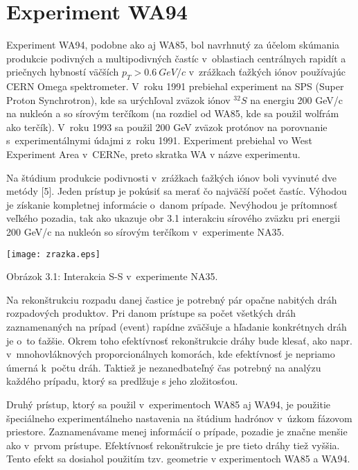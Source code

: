 \chapter{Experiment WA94}
Experiment WA94, podobne ako aj WA85, bol navrhnutý za účelom skúmania 
produkcie podivných a multipodivných častíc v~oblastiach centrálnych rapidít
a priečnych hybností väčších $p_{T}>0.6\: GeV/c$ v~zrážkach ťažkých
iónov používajúc CERN Omega spektrometer. V~roku 1991 prebiehal
experiment na SPS (Super Proton Synchrotron), kde sa urýchľoval zväzok
iónov $^{32}S$ na energiu 200 GeV/c na nukleón a so sírovým terčíkom (na
rozdiel od WA85, kde sa použil wolfrám ako terčík). V~roku 1993 sa použil
200 GeV zväzok protónov na porovnanie s~experimentálnymi údajmi z~roku
1991. Experiment prebiehal vo West Experiment Area v~CERNe, preto skratka WA
v názve experimentu.

Na štúdium produkcie podivnosti v~zrážkach ťažkých iónov boli
vyvinuté dve metódy [5]. Jeden prístup je pokúsiť sa merať čo najväčší
počet častíc. Výhodou je získanie kompletnej informácie o~danom prípade.
Nevýhodou je prítomnosť veľkého pozadia, tak ako ukazuje obr 3.1 interakciu
sírového zväzku pri energii 200 GeV/c na nukleón so sírovým terčíkom
v~experimente NA35.


\begin{center}
  \texttt{[image: zrazka.eps]}
\end{center}
\begin{center}
  Obrázok 3.1: Interakcia S-S v~experimente NA35.
\end{center}
\newpage
Na rekonštrukciu rozpadu danej častice je potrebný pár opačne nabitých dráh
rozpadových produktov. Pri danom prístupe sa počet všetkých dráh
zaznamenaných na prípad (event) rapídne zväčšuje a hľadanie konkrétnych
dráh je o~to ťažšie. Okrem toho efektívnosť rekonštrukcie dráhy bude klesať,
ako napr. v~mnohovláknových proporcionálnych komorách, kde efektívnosť je
nepriamo úmerná k~počtu dráh. Taktiež  je
nezanedbateľný čas potrebný na analýzu každého prípadu, ktorý sa predlžuje s
jeho zložitosťou.

Druhý prístup, ktorý sa použil v~experimentoch WA85 aj WA94, je použitie
špeciálneho experimentálneho nastavenia na štúdium hadrónov v~úzkom fázovom
priestore. Zaznamenávame menej informácií o prípade, pozadie je značne menšie
ako v~prvom prístupe. Efektívnosť rekonštrukcie je pre tieto dráhy tiež
vyššia. Tento efekt sa dosiahol použitím tzv.  geometrie v
experimentoch WA85 a WA94.

